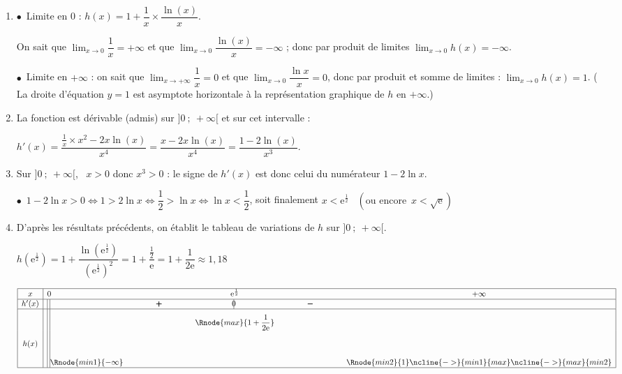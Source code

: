 \documentclass[10pt]{article}
\providecommand{\starredbullet}{\ensuremath{\bullet}}
\providecommand{\e}{{\mathrm{e}}}
\begin{document}
\begin{enumerate}
\item 
\starredbullet~Limite en $0$ : $h(x) = 1 + \dfrac{1}{x} \times \dfrac{\ln (x)}{x}$.

On sait que $\displaystyle\lim_{x \to 0} \dfrac{1}{x} = + \infty$ et que $\displaystyle\lim_{x \to 0} \dfrac{\ln (x)}{x} = - \infty$ ; donc par produit de limites $\displaystyle\lim_{x \to 0} h(x) = - \infty$.

\starredbullet~Limite en $+ \infty$ : on sait que $\displaystyle\lim_{x \to + \infty} \dfrac{1}{x} = 0$ et que $\displaystyle\lim_{x \to 0} \dfrac{\ln x}{x} = 0$, donc par produit et somme de limites : $\displaystyle\lim_{x \to 0} h(x) = 1$. ( La droite d'équation $y = 1$ est asymptote horizontale à la représentation graphique de $h$ en $+\infty$.)
  
\item 
La fonction est dérivable (admis) sur $]0~;~ +\infty[$ et sur cet intervalle :

$h'(x) = \dfrac{\frac{1}{x} \times x^2 - 2x\ln (x)}{x^4} = \dfrac{x - 2x\ln (x)}{x^4}  = \dfrac{1 - 2\ln (x)}{x^3}$.
\item 
Sur $]0~;~ +\infty[$, \, $x > 0$ donc $x^3 > 0$ : le signe de $h'(x)$ est donc celui du numérateur $1 - 2\ln x$.

\starredbullet~$1 - 2\ln x > 0 \iff 1 > 2\ln x \iff \dfrac{1}{2} > \ln x \iff  \ln x < \dfrac{1}{2}$, soit finalement $x < \e^{\frac{1}{2}}$ \, $\left(\text{ou encore }\, x < \sqrt{\e} \right)$

\item 
D'après les résultats précédents, on établit le tableau de variations de $h$ sur $]0~;~+\infty[$.

$h\left ( \e^{\frac{1}{2}}\right ) = 1+\dfrac{\ln\left (\e^{\frac{1}{2}}\right )}{\left (\e^{\frac{1}{2}}\right )^2}= 1+\dfrac{\frac{1}{2}}{\e}= 1+\dfrac{1}{2\e}\approx 1,18$

\begin{center}
{\renewcommand{\arraystretch}{1.5}
\def\esp{\hspace*{2.5cm}}
\def\hauteur{20pt}
$\begin{array}{|c|l*4{c}|}
\hline
x & 0  & \esp & \e^{\frac{1}{2}} & \esp & +\infty \\ 
\hline
h'(x) &  \vline\;\vline  &   \pmb{+} & \vline\hspace{-2.7pt}0 & \pmb{-} & \\ 
\hline
 & \vline\;\vline &  &   \Rnode{max}{1+\dfrac{1}{2\e}}  &  &  \rule{0pt}{\hauteur} \\  
h(x) &  \vline\;\vline &     &  &  &  \rule{0pt}{\hauteur} \\ 
 & \vline\;\vline \Rnode{min1}{-\infty} &   &  &  &   \Rnode{min2}{1} \rule{0pt}{\hauteur}    
 \ncline{->}{min1}{max} 
 \ncline{->}{max}{min2} 
 \\ 
\hline
\end{array} $
}
\end{center}	


\end{enumerate}
\end{document}
